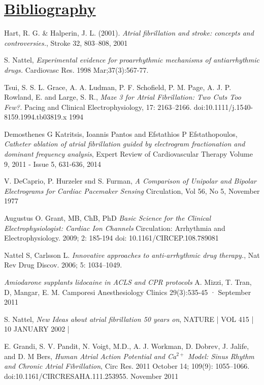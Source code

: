 \documentclass[twocolumn, a1paper]{article}
\begin{document}
\section{\textbf{\underline{Bibliography}}}
\begin{thebibliography}{7}

Hart, R. G. \& Halperin, J. L. (2001).
\emph{Atrial fibrillation and stroke: concepts and controversies.},
Stroke 32, 803–808,
2001

S. Nattel, 
\emph{ Experimental evidence for proarrhythmic mechanisms of antiarrhythmic drugs.}
Cardiovasc Res. 1998 Mar;37(3):567-77.

Tsui, S. S. L. Grace, A. A. Ludman, P. F. Schofield, P. M. Page, A. J. P. Rowland, E.  and Large, S. R., 
\emph{ Maze 3 for Atrial Fibrillation: Two Cuts Too Few?.}
 Pacing and Clinical Electrophysiology,
17: 2163–2166. doi:10.1111/j.1540-8159.1994.tb03819.x
1994


Demosthenes G Katritsis, Ioannis Pantos and Efstathios P Efstathopoulos, 
\emph{Catheter ablation of atrial fibrillation guided by electrogram fractionation and dominant frequency analysis},
Expert Review of Cardiovascular Therapy 
Volume 9, 2011 - Issue 5, 631-636, 2014


V. DeCaprio, P. Hurzeler snd S. Furman, 
\emph{A Comparison of Unipolar and Bipolar Electrograms for Cardiac Pacemaker Sensing}
Circulation, Vol 56, No 5, November 1977
 

Augustus O. Grant, MB, ChB, PhD
\emph{Basic Science for the Clinical Electrophysiologist: Cardiac Ion Channels}
Circulation: Arrhythmia and Electrophysiology.
2009; 2: 185-194
doi: 10.1161/CIRCEP.108.789081

Nattel S, Carlsson L.
\emph{ Innovative approaches to anti-arrhythmic drug therapy.},
Nat Rev Drug Discov. 2006; 5: 1034–1049. 


\emph{Amiodarone supplants lidocaine in ACLS and CPR protocols}
A. Mizzi, T. Tran, D, Mangar, E. M. Camporesi
Anesthesiology Clinics 29(3):535-45 · September 2011


S. Nattel, 
\emph{New Ideas about atrial fibrillation 50 years on},
 NATURE | VOL 415 | 10 JANUARY 2002 |

E. Grandi, S. V. Pandit, N. Voigt, M.D., A. J. Workman, D. Dobrev, J. Jalife, and D. M  Bers,
\emph{Human Atrial Action Potential and Ca$^{2+ }$ Model: Sinus Rhythm and Chronic Atrial Fibrillation},
Circ Res. 2011 October 14; 109(9): 1055–1066. doi:10.1161/CIRCRESAHA.111.253955.
November 2011


\end{thebibliography}
\end{document}

